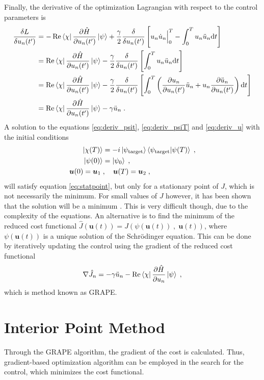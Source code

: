 Finally, the derivative of the optimization Lagrangian with respect to the control parameters is 
\begin{align}
	\frac{\delta L}{\delta u_n (t')} &= - \Re \bra{\chi} \pdv{\hat{H}}{u_n (t')} \ket{\psi} + \frac{\gamma}{2} \frac{\delta }{\delta u_n (t')} \left[ u_n \dot{u}_n \Big|_0^T - \int_0^T u_n \ddot{u}_n \mathrm{d}t \right] \nonumber \\
	&=  \Re \bra{\chi} \pdv{\hat{H}}{u_n (t')} \ket{\psi} - \frac{\gamma}{2} \frac{\delta }{\delta u_n (t')} \left[ \int_0^T u_n \ddot{u}_n \mathrm{d}t \right] \nonumber \\
	&=  \Re \bra{\chi} \pdv{\hat{H}}{u_n (t')} \ket{\psi} - \frac{\gamma}{2} \frac{\delta }{\delta u_n (t')} \left[ \int_0^T \left( \pdv{u_n}{u_n (t')} \ddot{u}_n + u_n \pdv{\ddot{u}_n}{u_n (t')} \right) \mathrm{d}t \right] \nonumber \\
	&= \Re \bra{\chi} \pdv{\hat{H}}{u_n (t')} \ket{\psi} - \gamma \ddot{u}_n \; . \label{eq:deriv_u} 
\end{align} 
A solution to the equations \ref{eq:deriv_psit}, \ref{eq:deriv_psiT} and \ref{eq:deriv_u} with the initial conditions
\begin{align}
	\ket{\chi (T)} &= -i \ket{\psi_{\mathrm{target}}} \braket{\psi_{\mathrm{target}} | \psi (T)} \; , \\
	\ket{\psi (0)} &= \ket{\psi _0} \; , \\
	\boldsymbol{u}(0) = \boldsymbol{u}_1 \; &, \quad \boldsymbol{u}(T) = \boldsymbol{u}_2 \; ,
\end{align}
will satisfy equation \ref{eq:statpoint}, but only for a stationary point of $J$, which is not necessarily the minimum. For small values of $J$ however, it has been shown that the solution will be a minimum \cite{BECcontrol}. This is very difficult though, due to the complexity of the equations. An alternative is to find the minimum of the reduced cost functional $\hat{J}\left( \boldsymbol{u}(t) \right) =  J\left(\psi(\boldsymbol{u}(t)) \; , \; \boldsymbol{u}(t) \right)$, where $\psi(\boldsymbol{u}(t))$ is a unique solution of the Schrödinger equation. This can be done by iteratively updating the control using the gradient of the reduced cost functional
\begin{equation}
	\nabla \hat{J}_n = - \gamma \ddot{u}_n - \Re \bra{\chi} \pdv{\hat{H}}{u_n} \ket{\psi} \; ,
\end{equation}
which is method known as GRAPE. 

\section{Interior Point Method}
Through the GRAPE algorithm, the gradient of the cost is calculated. Thus, gradient-based optimization algorithm can be employed in the search for the control, which minimizes the cost functional. 


